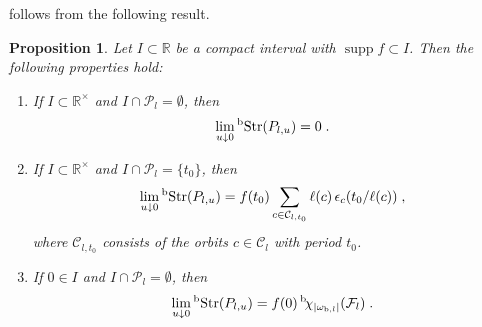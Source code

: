 \documentclass{memo-l}
\theoremstyle{plain}
\newtheorem{prop}[thm]{Proposition}
\theoremstyle{definition}
\theoremstyle{remark}
\newcommand{\R}{\mathbb{R}}
\newcommand{\CC}{\mathcal{C}}
\newcommand{\FF}{\mathcal{F}}
\newcommand{\PP}{\mathcal{P}}
\newcommand{\supp}{\operatorname{supp}}
\newcommand{\Str}{\operatorname{Str}}
\newcommand{\bStr}{{}^{\text{\rm b}}\!\Str}
\newcommand{\bchi}{{}^{\text{\rm b}}\!\chi}
\numberwithin{section}{chapter}
\numberwithin{equation}{section}%
\begin{document}
 follows from the following result.

\begin{prop}\label{p: lim_u -> 0 bTrs(P_l,u,z)}
Let $I\subset\R$ be a compact interval with $\supp f\subset I$. Then the following properties hold:
\begin{enumerate}[{\rm(i)}]
\item\label{i: no periods in I} If $I\subset\R^\times$ and $I\cap\PP_l=\emptyset$, then
\[
\lim_{u\downarrow0}\bStr(P_{l,u})=0\;.
\]
\item\label{i: one period in I} If $I\subset\R^\times$ and $I\cap\PP_l=\{t_0\}$, then
\[
\lim_{u\downarrow0}\bStr(P_{l,u})=f(t_0)\sum_{c\in\CC_{l,t_0}}\ell(c)\,\epsilon_c(t_0/\ell(c))\;,
\]
where $\CC_{l,t_0}$ consists of the orbits $c\in\CC_l$ with period $t_0$.
\item\label{i: 0 in I} If $0\in I$ and $I\cap\PP_l=\emptyset$, then
\[
\lim_{u\downarrow0}\bStr(P_{l,u})=f(0)\,\bchi_{|\omega_{\text{\rm b},l}|}(\FF_l)\;.
\]
\end{enumerate}
\end{prop}
\end{document}
